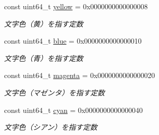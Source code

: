 \begin{DoxyCompactItemize}
\mbox{\label{namespace_g_a_1_1color_a22173bdca74226804aa81febf4015cb3}} 
const uint64\+\_\+t \mbox{\hyperlink{namespace_g_a_1_1color_a22173bdca74226804aa81febf4015cb3}{yellow}} = 0x00\textquotesingle{}00\textquotesingle{}00\textquotesingle{}00\textquotesingle{}00\textquotesingle{}00\textquotesingle{}00\textquotesingle{}08
\begin{DoxyCompactList}\small\item\em 文字色（黄）を指す定数 \end{DoxyCompactList}\item 
\mbox{\label{namespace_g_a_1_1color_a48acb8e4e9538a599190aa90888677cd}} 
const uint64\+\_\+t \mbox{\hyperlink{namespace_g_a_1_1color_a48acb8e4e9538a599190aa90888677cd}{blue}} = 0x00\textquotesingle{}00\textquotesingle{}00\textquotesingle{}00\textquotesingle{}00\textquotesingle{}00\textquotesingle{}00\textquotesingle{}10
\begin{DoxyCompactList}\small\item\em 文字色（青）を指す定数 \end{DoxyCompactList}\item 
\mbox{\label{namespace_g_a_1_1color_a8429676f8b430aaf6b8f99c4f1189350}} 
const uint64\+\_\+t \mbox{\hyperlink{namespace_g_a_1_1color_a8429676f8b430aaf6b8f99c4f1189350}{magenta}} = 0x00\textquotesingle{}00\textquotesingle{}00\textquotesingle{}00\textquotesingle{}00\textquotesingle{}00\textquotesingle{}00\textquotesingle{}20
\begin{DoxyCompactList}\small\item\em 文字色（マゼンタ）を指す定数 \end{DoxyCompactList}\item 
\mbox{\label{namespace_g_a_1_1color_a09c3d63c806d94be602f39e17e8bbc61}} 
const uint64\+\_\+t \mbox{\hyperlink{namespace_g_a_1_1color_a09c3d63c806d94be602f39e17e8bbc61}{cyan}} = 0x00\textquotesingle{}00\textquotesingle{}00\textquotesingle{}00\textquotesingle{}00\textquotesingle{}00\textquotesingle{}00\textquotesingle{}40
\begin{DoxyCompactList}\small\item\em 文字色（シアン）を指す定数 \end{DoxyCompactList}\item 
\mbox{\label{namespace_g_a_1_1color_a6e43291dbd13c3850c9c170b5c4f2adf}} 

\end{DoxyCompactItemize}
